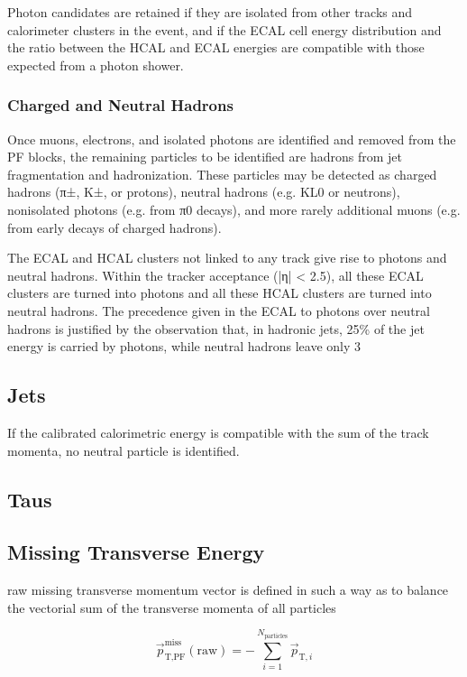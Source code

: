 Photon candidates are retained if they are isolated from other tracks and calorimeter clusters in the event, and if the ECAL cell energy distribution and the ratio between the HCAL and ECAL energies are compatible with those expected from a photon shower.



\subsubsection{Charged and Neutral Hadrons}

Once muons, electrons, and isolated photons are identified and removed from the PF blocks, the remaining particles to be identified are hadrons from jet fragmentation and hadronization. These particles may be detected as charged hadrons (π±, K±, or protons), neutral hadrons (e.g. KL0 or neutrons), nonisolated photons (e.g. from π0 decays), and more rarely additional muons (e.g. from early decays of charged hadrons).

The ECAL and HCAL clusters not linked to any track give rise to photons and neutral hadrons. Within the tracker acceptance (|η| < 2.5), all these ECAL clusters are turned into photons and all these HCAL clusters are turned into neutral hadrons. The precedence given in the ECAL to photons over neutral hadrons is justified by the observation that, in hadronic jets, 25\% of the jet energy is carried by photons, while neutral hadrons leave only 3%

\subsection{Jets}

If the calibrated calorimetric energy is compatible with the sum of the track momenta, no neutral particle is identified.



\subsection{Taus}
\subsection{Missing Transverse Energy}

raw missing transverse momentum vector is defined in such a way as to balance the vectorial sum of the transverse momenta of all particles

\begin{equation}
\vec{p}^{\text{miss}}_{\text{T,PF}}(\text{raw}) = - \sum^{N_{\text{particles}}}_{i=1} \vec{p}_{\text{T},i}
\end{equation}

